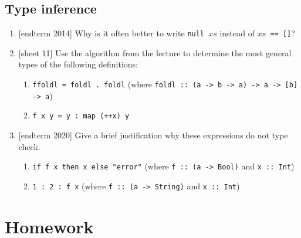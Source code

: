 \documentclass{article}
\def\code#1{\texttt{#1}}
\begin{document}
\subsection{Type inference}
\begin{enumerate}
    \item {[endterm 2014]} Why is it often better to write \code{null $xs$} instead of \code{$xs$ == []}?

    \item {[sheet 11]} Use the algorithm from the lecture to determine the most general types of the following definitions:
        \begin{enumerate}
            \item \code{ffoldl = foldl . foldl} (where \code{foldl :: (a -> b -> a) -> a -> [b] -> a})
            \item \code{f x y = y : map (++x) y}
        \end{enumerate}

    \item {[endterm 2020]} Give a brief justification why these expressions do not type check.
        \begin{enumerate}
            \item \code{if f x then x else "error"} (where \code{f :: (a -> Bool)} and \code{x :: Int})
            \item \code{1 : 2 : f x} (where \code{f :: (a -> String)} and \code{x :: Int})
        \end{enumerate}
\end{enumerate}

\section{Homework}
\end{document}
